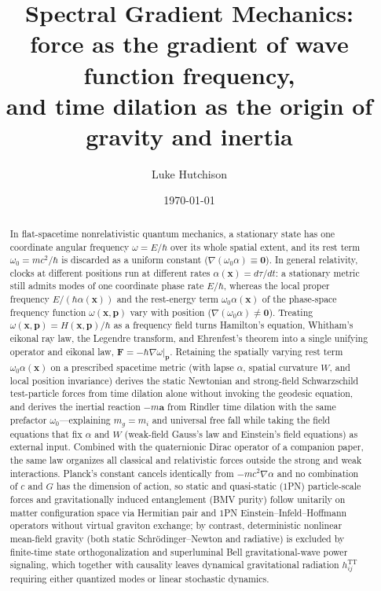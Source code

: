 \documentclass[aps,prd,onecolumn,tightenlines,nofootinbib,notitlepage,11pt,floatfix]{revtex4-2}
\theoremstyle{indentedtheorem}
\begin{document}
\title{Spectral Gradient Mechanics:\texorpdfstring{\\}{ }%
force as the gradient of wave function frequency,\texorpdfstring{\\}{ }%
and time dilation as the origin of gravity and inertia}
\newcommand{\companionauthor}{\ifanonymous Anonymous\else L.~Hutchison\fi}
\ifanonymous\else\author{Luke Hutchison}
\noaffiliation\fi
\date{\today}

\begin{abstract}
In flat-spacetime nonrelativistic quantum mechanics, a stationary state has one coordinate angular frequency $\omega=E/\hbar$ over its whole spatial extent, and its rest term $\omega_0=mc^2/\hbar$ is discarded as a uniform constant ($\nabla(\omega_0\alpha)\equiv\mathbf{0}$). In general relativity, clocks at different positions run at different rates $\alpha(\mathbf{x})=d\tau/dt$: a stationary metric still admits modes of one coordinate phase rate $E/\hbar$, whereas the local proper frequency $E/(\hbar\alpha(\mathbf{x}))$ and the rest-energy term $\omega_0\alpha(\mathbf{x})$ of the phase-space frequency function $\omega(\mathbf{x},\mathbf{p})$ vary with position ($\nabla(\omega_0\alpha)\neq\mathbf{0}$). Treating $\omega(\mathbf{x},\mathbf{p})=H(\mathbf{x},\mathbf{p})/\hbar$ as a frequency field turns Hamilton's equation, Whitham's eikonal ray law, the Legendre transform, and Ehrenfest's theorem into a single unifying operator and eikonal law, $\mathbf{F}=-\hbar\nabla\omega|_{\mathbf{p}}$. Retaining the spatially varying rest term $\omega_0\alpha(\mathbf{x})$ on a prescribed spacetime metric (with lapse $\alpha$, spatial curvature $W$, and local position invariance) derives the static Newtonian and strong-field Schwarzschild test-particle forces from time dilation alone without invoking the geodesic equation, and derives the inertial reaction $-m\mathbf{a}$ from Rindler time dilation with the same prefactor $\omega_0$---explaining $m_g=m_i$ and universal free fall while taking the field equations that fix $\alpha$ and $W$ (weak-field Gauss's law and Einstein's field equations) as external input. Combined with the quaternionic Dirac operator of a companion paper, the same law organizes all classical and relativistic forces outside the strong and weak interactions. Planck's constant cancels identically from $-mc^2\nabla\alpha$ and no combination of $c$ and $G$ has the dimension of action, so static and quasi-static ($1$PN) particle-scale forces and gravitationally induced entanglement (BMV purity) follow unitarily on matter configuration space via Hermitian pair and $1$PN Einstein--Infeld--Hoffmann operators without virtual graviton exchange; by contrast, deterministic nonlinear mean-field gravity (both static Schr\"odinger--Newton and radiative) is excluded by finite-time state orthogonalization and superluminal Bell gravitational-wave power signaling, which together with causality leaves dynamical gravitational radiation $h_{ij}^\text{TT}$ requiring either quantized modes or linear stochastic dynamics.
\end{abstract}
\end{document}
